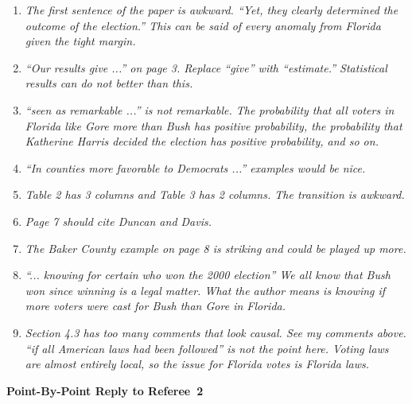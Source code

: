 \documentclass[11pt]{article}
\begin{document}
\bigskip
{}

\begin{enumerate}
\item {\it The first sentence of the paper is awkward.  ``Yet, they
    clearly determined the outcome of the election.'' This can be said
    of every anomaly from Florida given the tight margin.}
  
\item {\it ``Our results give ...'' on page 3.  Replace ``give'' with
    ``estimate.'' Statistical results can do not better than this.}
  
\item {\it ``seen as remarkable ...'' is not remarkable.  The
    probability that all voters in Florida like Gore more than Bush
    has positive probability, the probability that Katherine Harris
    decided the election has positive probability, and so on.}
  
\item {\it ``In counties more favorable to Democrats ...'' examples
    would be nice.}
  
\item {\it Table 2 has 3 columns and Table 3 has 2 columns.  The
    transition is awkward.}
  
\item {\it Page 7 should cite Duncan and Davis.}
  
\item {\it The Baker County example on page 8 is striking and could be
    played up more.}
  
\item {\it ``... knowing for certain who won the 2000 election'' We
    all know that Bush won since winning is a legal matter.  What the
    author means is knowing if more voters were cast for Bush than
    Gore in Florida.}
  
\item {\it Section 4.3 has too many comments that look causal.  See my
    comments above.  ``if all American laws had been followed'' is not
    the point here.  Voting laws are almost entirely local, so the
    issue for Florida votes is Florida laws.}


\end{enumerate}

\clearpage
\begin{center}
  {\bf \Large Point-By-Point Reply to Referee~2}
\end{center}
\end{document}
